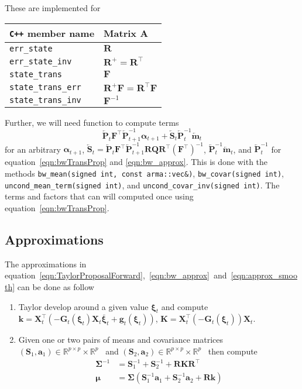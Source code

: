 \documentclass[9pt, notitlepage]{article}
\renewcommand{\vec}[1]{\bm{#1}}
\newcommand{\vecb}[1]{\bar{\vec{#1}}}
\newcommand{\vecLarrow}[1]{\overleftarrow{\vec{#1}}}
\newcommand{\mat}[1]{\mathbf{#1}}
\newcommand{\matLarrow}[1]{\overleftarrow{\mat{#1}}}
\newcommand{\Lparen}[1]{\left( #1\right)}
\newcommand{\dimState}{p}
\begin{document}
These are implemented for %
%
\begin{center}
\begin{tabular}{ l l } 
 \verb|C++| member name & Matrix $\mat{A}$ \\
 \hline
 \verb|err_state|               & $\mat{R}$ \\
 \verb|err_state_inv|           & $\mat{R}^{+} = \mat{R}^\top$ \\
 \verb|state_trans|             & $\mat{F}$ \\
 \verb|state_trans_err|         & $\mat{R}^{+}\mat{F} = \mat{R}^\top\mat{F}$ \\
 \verb|state_trans_inv|         & $\mat{F}^{-1}$
\end{tabular}
\end{center}%
%
Further, we will need function to compute terms %
%
$$
	\matLarrow{P}_t\mat{F}^\top\matLarrow{P}_{t + 1}^{-1}\vec{\alpha}_{t+1}
		+ \matLarrow{S}_t\matLarrow{P}_t^{-1} \vecLarrow{m}_t
$$%
%
for an arbitrary $\vec{\alpha}_{t+1}$, %
$\matLarrow{S}_t = \matLarrow{P}_t\mat{F}^\top\matLarrow{P}_{t + 1}^{-1}\mat{R}\mat{Q}\mat{R}^\top\Lparen{\mat{F}^\top}^{-1}$, %
$\matLarrow{P}_t^{-1}\vecLarrow{m}_t$, and $\matLarrow{P}_t^{-1}$ for equation~\eqref{eqn:bwTransProp} and \eqref{eqn:bw_approx}. This is done with the methods 
\texttt{bw\_mean(signed int, const arma::vec\&)}, %
\texttt{bw\_covar(signed int)}, %
\texttt{uncond\_mean\_term(signed int)}, and \texttt{uncond\_covar\_inv(signed int)}. The terms and factors that can will computed once using equation~\eqref{eqn:bwTransProp}.

\subsection{Approximations}
The approximations in equation~\eqref{eqn:TaylorProposalForward},~\eqref{eqn:bw_approx}~and~\eqref{eqn:approx_smooth} can be done as follow 

\begin{enumerate}
	\item Taylor develop around a given value $\vec{\xi}_t$ and compute %
	$\vec{k} = \mat{X}_t^\top
		\Lparen{
			-\mat{G}_t\Lparen{\vec{\xi}_{t}}
			\mat{X}_t\vecb{\xi}_{t} +
			\vec{g}_t\Lparen{\vec{\xi}_{t}}
		}$, %
		$\mat{K} = \mat{X}_t^\top\Lparen{-\mat{G}_t\Lparen{\vec{\xi}_{t}}}\mat{X}_t$.
	\item Given one or two pairs of means and covariance matrices%
	$(\mat{S}_1, \vec{a}_1)\in \mathbb{R}^{\dimState\times\dimState}\times\mathbb{R}^\dimState$%
	~and %
	$(\mat{S}_2, \vec{a}_2)\in \mathbb{R}^{\dimState\times\dimState}\times\mathbb{R}^\dimState$%
	~then compute %
	\begin{align*}
		\mat{\Sigma}^{-1} &= \mat{S}_1^{-1} + \mat{S}_2^{-1} + \mat{R}\mat{K}\mat{R}^\top \\
		\vec{\mu} &= \mat{\Sigma}\Lparen{
		    \mat{S}_1^{-1}\vec{a}_1 + 
		    \mat{S}_2^{-1}\vec{a}_2 + \mat{R}\vec{k}}
	\end{align*}
\end{enumerate}
\end{document}
